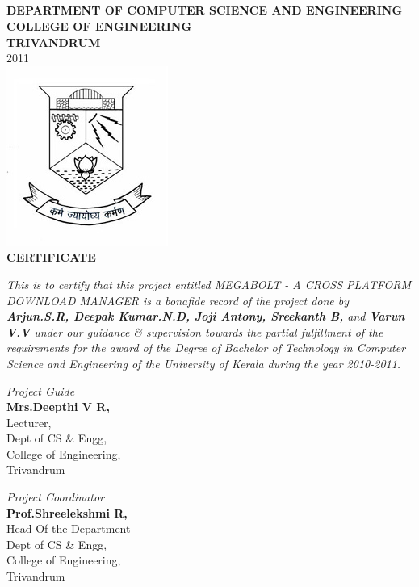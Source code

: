 \documentclass[pdftex,12pt,a4paper,pdfencoding=unicode]{article}
\begin{document}
\begin{onehalfspace}
\section*{}
\thispagestyle{empty}
\begin{center}
  {\large \bf DEPARTMENT OF COMPUTER SCIENCE AND ENGINEERING}\\
  {\small \bf COLLEGE OF ENGINEERING}\\
  {\small \bf TRIVANDRUM}\\
  {\small 2011}\\
  \vspace{5mm}
  \includegraphics[scale=0.75]{pic/cetemblem.jpg}\\
    {\large \bf CERTIFICATE}\\[0.75cm]
\end{center}
{\it This is to certify that this project entitled {\textsc MEGABOLT - A CROSS PLATFORM DOWNLOAD MANAGER} 
is a bonafide record of the project done by {\bf \emph{Arjun.S.R, Deepak Kumar.N.D, Joji Antony, Sreekanth B,}} 
and {\bf \emph{Varun V.V}} under our guidance \& supervision towards the partial fulfillment of the requirements 
for the award of the Degree of Bachelor of Technology in Computer Science and Engineering of the University of 
Kerala during the year 2010-2011.}

\begin{minipage}{0.4\textwidth}
  \begin{flushleft}
    {
      \small \emph{Project Guide}\\
               {\bf Mrs.Deepthi V R,}\\
               Lecturer,\\
               Dept of CS \& Engg,\\
               College of Engineering,\\Trivandrum
    }
  \end{flushleft}
\end{minipage}
\begin{minipage}{0.4\textwidth}
  \begin{flushright}
    {
      \small
      \emph{Project Coordinator}\\
         {\bf Prof.Shreelekshmi R,}\\
         Head Of the Department\\
         Dept of CS \& Engg,\\
         College of Engineering,\\Trivandrum
    }
  \end{flushright}
\end{minipage}
\vfill
\newpage

\end{onehalfspace}
\end{document}
